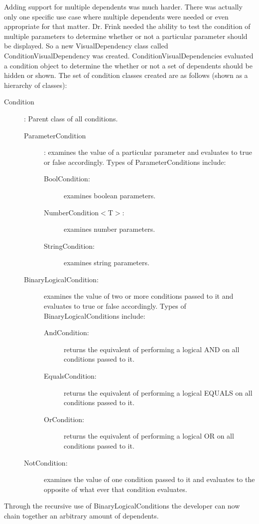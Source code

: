 Adding support for multiple dependents was much harder. There was actually only 
one specific use case where multiple dependents were needed or even appropriate 
for that matter. Dr.
Frink needed the ability to test the condition of multiple parameters to determine whether or not a particular parameter should be displayed.
So a new VisualDependency class called ConditionVisualDependency was created. ConditionVisualDependencies evaluated a condition object to
determine the whether or not a set of dependents should be hidden or shown. The set of condition classes created are as follows (shown as a hierarchy of classes):
\begin{description}
	\item[Condition]: Parent class of all conditions.
	\begin{description}
		\item[ParameterCondition]: examines the value of a particular parameter and evaluates to true or false accordingly. Types of ParameterConditions include:
		\begin{description}
			\item[BoolCondition:] examines boolean parameters.
			\item[NumberCondition$<$T$>$:] examines number parameters.
			\item[StringCondition:] examines string parameters.
		\end{description}
		\item[BinaryLogicalCondition:] examines the value of two or more conditions passed to it and evaluates to true or false accordingly. Types of BinaryLogicalConditions include:
		\begin{description}
			\item[AndCondition:] returns the equivalent of performing a logical AND on all conditions passed to it.
			\item[EqualsCondition:] returns the equivalent of performing a logical EQUALS on all conditions passed to it.
			\item[OrCondition:] returns the equivalent of performing a logical OR on all conditions passed to it.
		\end{description}
		\item[NotCondition:] examines the value of one condition passed to it and evaluates to the opposite of what ever that condition evaluates.
	\end{description}
\end{description}
Through the recursive use of BinaryLogicalConditions the developer can now chain together an arbitrary amount of dependents.

